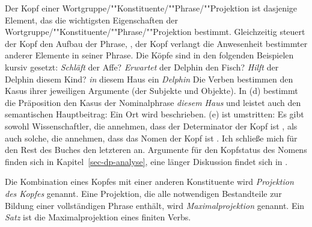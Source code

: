 Der Kopf einer Wortgruppe/""Konstituente/""Phrase/""Projektion ist dasjenige Element,
das die wichtigsten Eigenschaften der Wortgruppe/""Konstituente/""Phrase/""Projektion bestimmt.
Gleichzeitig steuert der Kopf den Aufbau der Phrase, \dash, der Kopf verlangt
die Anwesenheit bestimmter anderer Elemente in seiner Phrase. Die Köpfe sind
in den folgenden Beispielen kursiv gesetzt:
\eal
\ex \emph{Schläft} der Affe?
\ex \emph{Erwartet} der Delphin den Fisch?
\ex \emph{Hilft} der Delphin diesem Kind?
\ex \emph{in} diesem Haus
\ex ein \emph{Delphin}
\zl
Die Verben bestimmen den Kasus ihrer jeweiligen Argumente (der Subjekte und Objekte).
In (d) bestimmt die Präposition den Kasus der Nominalphrase \emph{diesem Haus} und
leistet auch den semantischen Hauptbeitrag: Ein Ort wird beschrieben. (e)
ist umstritten: Es gibt sowohl Wissenschaftler, die annehmen, dass der Determinator
der Kopf ist 
\parencites[]{Ajdukiewicz35a-u}{VH77a-u,Brame82a}[--92]{Hudson84a-u}{Hellan86a,Abney87a,Netter94,Netter98a}, als auch solche, die annehmen,
dass das Nomen der Kopf ist \parencites{vanLangendonck94a}[]{ps2}{Demske2001a}{Hudson2004a}{Bruening2009a}{MyPM2021a}{MuellerHeadless}.
Ich schließe mich für den Rest des Buches den letzteren an. Argumente für den Kopfstatus des Nomens
finden sich in Kapitel~\ref{sec-dp-analyse}, eine länger Diskussion findet sich in .

Die Kombination eines Kopfes mit einer anderen Konstituente wird \emph{Projektion
des Kopfes} genannt. Eine Projektion, die alle notwendigen Bestandteile zur Bildung
einer vollständigen Phrase enthält, wird \emph{Maximalprojektion}
genannt. Ein \emph{Satz} ist die Maximalprojektion eines finiten Verbs.

